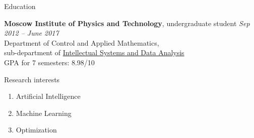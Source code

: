 \documentclass{resume} %
\begin{document}

\begin{rSection}{Education}

{\bf Moscow Institute of Physics and Technology}, undergraduate student \hfill {\em Sep 2012 -- June 2017} \\ 
Department of Control and Applied Mathematics,\\sub-department of \href{http://www.machinelearning.ru/}{Intellectual Systems and Data Analysis}\\
GPA for 7 semesters: 8.98/10

\end{rSection}


\begin{rSection}{Research interests}
\begin{enumerate}
\item Artificial Intelligence
\item Machine Learning
\item Optimization
\end{enumerate}
\end{rSection}
\end{document}

